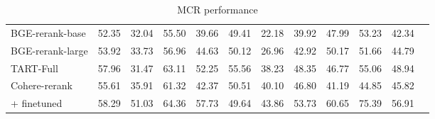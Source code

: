 \begin{table}[!tp]
{\begin{tabular}{lcccccc|c|cc|cc}
\midrule
BGE-rerank-base &52.35 &32.04 &55.50 &39.66 &49.41 &22.18 &39.92 &47.99 &53.23 &42.34 \\
BGE-rerank-large &53.92 &33.73 &56.96 &44.63 &50.12 &26.96 &42.92 &50.17 &51.66 &44.79 \\
TART-Full &57.96 &31.47 &63.11 &52.25 &55.56 &38.23 &48.35 &46.77 &55.06 &48.94 \\
Cohere-rerank &55.61 &35.91 &61.32 &42.37 &50.51 &40.10 &46.80 &41.19 &44.85 &45.82 \\
\quad + finetuned &58.29 &51.03 &64.36 &57.73 &49.64 &43.86 &53.73 &60.65 &75.39 &56.91 \\
\bottomrule
\end{tabular}}
\caption{MCR performance}\label{tab: mcr-final}
\end{table}